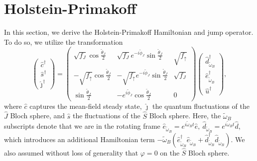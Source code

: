 \documentclass[11pt]{article}
\begin{document}
\section{Holstein-Primakoff}
\label{sec:HP}

In this section, we derive the Holstein-Primakoff Hamiltonian and jump operator. To do so, we utilize the transformation 
\begin{equation}
    \left( 
    \begin{array}{c}
    \hat c^\dagger \\
    \hat s^\dagger \\
    \hat \jmath^\dagger 
    \end{array} 
    \right)
    = 
    \left(
    \begin{array}{ccc}
         \sqrt{f_J} \cos \frac{\tilde{\theta}_J}{2} & \sqrt{f_J} e^{-i \tilde{\phi}_J} \sin \frac{\tilde{\theta}_J}{2} & \sqrt{f_{\uparrow}} \\
         -\sqrt{f_{\uparrow}} \cos \frac{\tilde{\theta}_J}{2} & -\sqrt{f_{\uparrow}} e^{- i \tilde{\phi}_J} \sin \frac{\tilde{\theta}_J}{2} & \sqrt{f_J}\\
         \sin \frac{\tilde{\theta}_J}{2} & -e^{i \tilde{\phi}_J} \cos \frac{\tilde{\theta}_J}{2} & 0
    \end{array} \right)
    \left(
    \begin{array}{c}
        \hat d_{\tilde{\omega}_B}^\dagger \\
        \hat{e}_{\tilde{\omega}_B}^\dagger \\
        \hat u^\dagger     
    \end{array}
    \right),
\end{equation}
where $\hat c$ captures the mean-field steady state, $\hat \jmath$ the quantum fluctuations of the $\hat J$ Bloch sphere, and $\hat s$ the fluctuations of the $\hat S$ Bloch sphere. Here, the $\tilde{\omega}_B$ subscripts denote that we are in the rotating frame $\hat e_{\tilde{\omega}_B} = e^{i \tilde{\omega}_B t} \hat e, ~\hat d_{\tilde{\omega}_B} = e^{i \tilde{\omega}_B t} \hat d$, which introduces an additional Hamiltonian term $-\tilde{\omega}_B(\hat{e}^\dagger_{\tilde{\omega}_B} \hat{e}_{\tilde{\omega}_B} + \hat{d}^\dagger_{\tilde{\omega}_B} \hat{d}_{\tilde{\omega}_B})$. We also assumed without loss of generality that $\varphi = 0$ on the $\hat S$ Bloch sphere.
\end{document}
